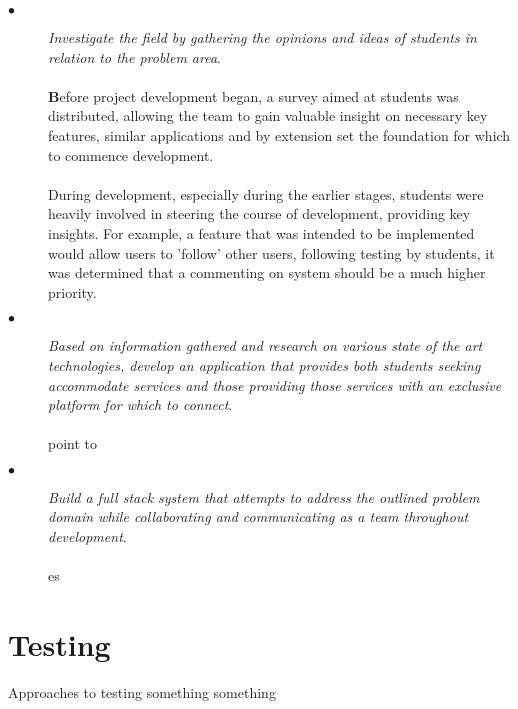 \begin{description}
  \item[$\bullet$] \textit{Investigate the field by gathering the opinions and ideas of students in relation to the problem area}. 
  
  \paragraph{}
  \textbf{B}efore project development began, a survey aimed at students was distributed, allowing the team to gain valuable insight on necessary key features, similar applications and by extension set the foundation for which to commence development. 
  
  \paragraph{}
  During development, especially during the earlier stages, students were heavily involved in steering the course of development, providing key insights. For example, a feature that was intended to be implemented would allow users to 'follow' other users, following testing by students, it was determined that a commenting on system should be a much higher priority.


  \item[$\bullet$] \textit{Based on information gathered and research on various state of the art technologies, develop an application that provides both students seeking accommodate services and those providing those services with an exclusive platform for which to connect}. 

  \paragraph{}
  \textbf{} point to
  

  \item[$\bullet$] \textit{Build a full stack system that attempts to address the outlined problem domain while collaborating and communicating as a team throughout development}. 
  
  \paragraph{}
  \textbf{} es
  
  
\end{description}


\section{Testing}
Approaches to testing something something
